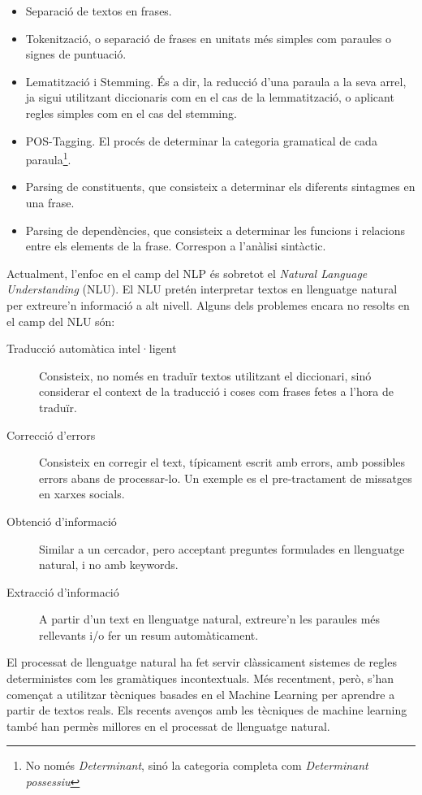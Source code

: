 \begin{itemize}
    \item Separació de textos en frases.
    \item Tokenització, o separació de frases en unitats més simples com paraules o signes de puntuació.
    \item Lematització i Stemming. És a dir, la reducció d'una paraula a la seva arrel, ja sigui utilitzant diccionaris com en el cas de la lemmatització, o aplicant regles simples com en el cas del stemming.
    \item POS-Tagging. El procés de determinar la categoria gramatical de cada paraula\footnote{No només \emph{Determinant}, sinó la categoria completa com \emph{Determinant possessiu}}.
    \item Parsing de constituents, que consisteix a determinar els diferents sintagmes en una frase.
    \item Parsing de dependències, que consisteix a determinar les funcions i relacions entre els elements de la frase. Correspon a l'anàlisi sintàctic.
\end{itemize}

Actualment, l'enfoc en el camp del NLP és sobretot el \emph{Natural Language Understanding} (NLU). El NLU pretén interpretar textos en llenguatge natural per extreure'n informació a alt nivell. Alguns dels problemes encara no resolts en el camp del NLU són:

\begin{description}
    \item[Traducció automàtica intel·ligent]{Consisteix, no només en traduïr textos utilitzant el diccionari, sinó considerar el context de la traducció i coses com frases fetes a l'hora de traduïr.}
    \item[Correcció d'errors]{Consisteix en corregir el text, típicament escrit amb errors, amb possibles errors abans de processar-lo. Un exemple es el pre-tractament de missatges en xarxes socials.}
    \item[Obtenció d'informació]{Similar a un cercador, pero acceptant preguntes formulades en llenguatge natural, i no amb keywords.}
    \item[Extracció d'informació]{A partir d'un text en llenguatge natural, extreure'n les paraules més rellevants i/o fer un resum automàticament.}
\end{description}

El processat de llenguatge natural ha fet servir clàssicament sistemes de regles deterministes com les gramàtiques incontextuals. Més recentment, però, s'han començat a utilitzar tècniques basades en el Machine Learning\cite{nlp_ml} per aprendre a partir de textos reals. Els recents avenços amb les tècniques de machine learning també han permès millores en el processat de llenguatge natural\cite{nlp_dl}. 


